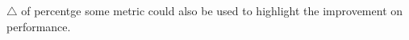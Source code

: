 
$\triangle$ of percentge some metric could also be used to highlight the improvement on performance.

